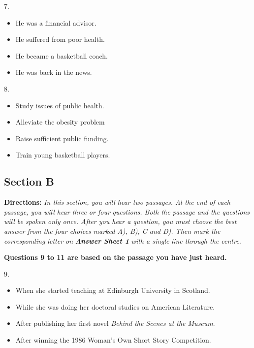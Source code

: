 \documentclass[UTF8,11pt]{ctexart}
\begin{document}
7.


\begin{itemize}[leftmargin=2em,itemsep=.2em,topsep=.4em]\item[A.] He was a financial advisor.
\item[B.] He suffered from poor health.
\item[C.] He became a basketball coach.
\item[D.] He was back in the news.
\end{itemize}

8.


\begin{itemize}[leftmargin=2em,itemsep=.2em,topsep=.4em]\item[A.] Study issues of public health.
\item[B.] Alleviate the obesity problem
\item[C.] Raise sufficient public funding.
\item[D.] Train young basketball players.
\end{itemize}

\subsection*{\textbf{Section B}}


\textbf{Directions:} \textit{In this section, you will hear two passages. At the end of each passage, you will hear three or four} \textit{questions. Both the passage and the questions will be spoken only once. After you hear a question, you must} \textit{choose the best answer from the four choices marked A), B), C and D). Then mark the corresponding letter on} \textbf{\textit{Answer Sheet 1}}\textit{ with a single line through the centre.}


\textbf{Questions 9 to 11 are based on the passage you have just heard.}


9.


\begin{itemize}[leftmargin=2em,itemsep=.2em,topsep=.4em]\item[A.] When she started teaching at Edinburgh University in Scotland.
\item[B.] While she was doing her doctoral studies on American Literature.
\item[C.] After publishing her first novel \textit{Behind the Scenes at the Museum}.
\item[D.] After winning the 1986 Woman’s Own Short Story Competition.
\end{itemize}
\end{document}
